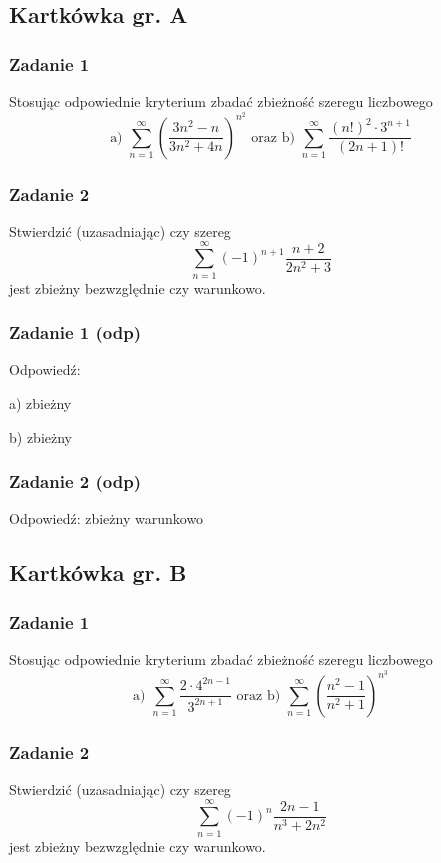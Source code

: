 \documentclass[11pt]{article}
\begin{document}
\subsection{Kartkówka gr. A}
\subsubsection{Zadanie 1}
Stosując odpowiednie kryterium zbadać zbieżność szeregu liczbowego
\[
    \text{a) } \sum_{n = 1}^{\infty}(\frac{3n^2 - n}{3n^2 + 4n})^{n^2} \text{ oraz }
    \text{b) }\sum_{n = 1}^{\infty}\frac{(n!)^2 \cdot 3^{n+1}}{(2n + 1)!}
\]

\subsubsection{Zadanie 2}
Stwierdzić (uzasadniając) czy szereg
\[
    \sum_{n = 1}^{\infty} (-1)^{n+1} \frac{n + 2}{2n^2 + 3}
\]
jest zbieżny bezwzględnie czy warunkowo.
\subsubsection{Zadanie 1 (odp)}
Odpowiedź: 
\begin{list}{}{}
    \item[a) ] zbieżny
    \item[b) ] zbieżny
\end{list}
\subsubsection{Zadanie 2 (odp)}
Odpowiedź: zbieżny warunkowo

\subsection{Kartkówka gr. B}
\subsubsection{Zadanie 1}
Stosując odpowiednie kryterium zbadać zbieżność szeregu liczbowego
\[
    \text{a) } \sum_{n = 1}^{\infty}\frac{2 \cdot 4^{2n - 1}}{3^{2n + 1}} \text{ oraz }
    \text{b) }\sum_{n = 1}^{\infty}(\frac{n^2 - 1}{n^2 + 1})^{n^3}
\]

\subsubsection{Zadanie 2}
Stwierdzić (uzasadniając) czy szereg
\[
    \sum_{n = 1}^{\infty} (-1)^{n} \frac{2n - 1}{n^3 + 2n^2}
\]
jest zbieżny bezwzględnie czy warunkowo.
\end{document}

